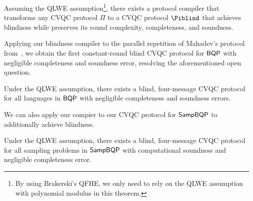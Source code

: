 %
%
\begin{theorem}[informal]
Assuming the QLWE assumption\footnote{By using Brakerski's QFHE, we only need to rely on the QLWE assumption with polynomial modulus in this theorem.}, there exists a protocol compiler that transforms any CVQC protocol $\Pi$ to a CVQC protocol $\Piblind$ that achieves blindness while preserves its round complexity, completeness, and soundness.
\end{theorem}

Applying our blindness compiler to the parallel repetition of Mahadev's protocol from~\cite{arXiv:ChiaChungYam19, arXiv:AlaChiHun19}, we obtain the first constant-round blind CVQC protocol for $\operatorname{\mathsf{BQP}}$ with negligible completeness and soundness error, resolving the aforementioned open question.

\begin{theorem}[informal]
    Under the QLWE assumption, there exists a blind, four-message CVQC protocol for all languages in $\operatorname{\mathsf{BQP}}$ with negligible completeness and soundness errors.
\end{theorem}

We can also apply our compier to our CVQC protocol for $\operatorname{\mathsf{SampBQP}}$ to additionally achieve blindness. 

\begin{theorem}[informal]
        Under the QLWE assumption, there exists a blind, four-message CVQC protocol for all sampling problems in $\operatorname{\mathsf{SampBQP}}$ with  computational soundness and negligible completeness error.
\end{theorem}


